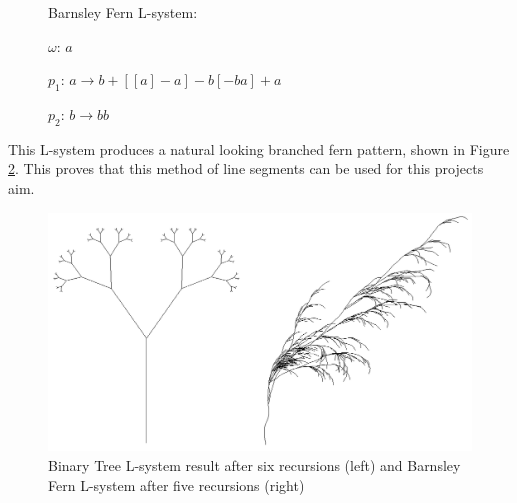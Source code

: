 \documentclass[final]{cmpreport}
\begin{document}
\begin{figure}[ht]
    Barnsley Fern L-system:

    $\omega$: $a$ 

    $p_1$: $a \rightarrow b+[[a]-a]-b[-ba]+a$

    $p_2$: $b \rightarrow bb$
    \label{fig:b-fern-string-system}
\end{figure}

This L-system produces a natural looking branched fern pattern, shown in Figure \ref{fig:b-tree-fern-string}. 
This proves that this method of line segments can be used for this projects aim.

\begin{figure}[ht]
    \includegraphics[scale=0.4]{b-tree-fern-string.png} 
    \centering
    \captionsetup{justification=centering}
    \caption{Binary Tree L-system result after six recursions (left) and Barnsley Fern L-system
             after five recursions (right)}
    \label{fig:b-tree-fern-string}
\end{figure}



\pagebreak

\end{document}
